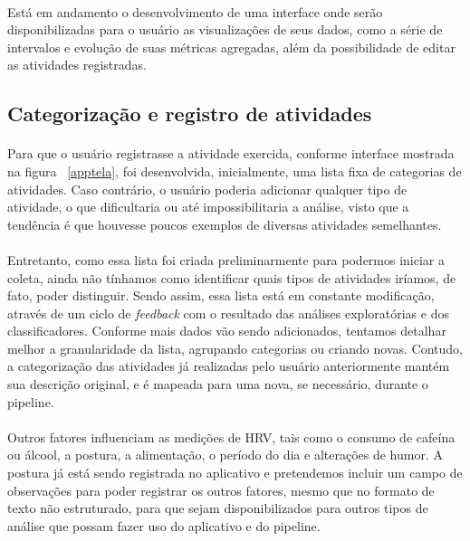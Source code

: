             \paragraph{} Está em andamento o desenvolvimento de uma interface onde serão disponibilizadas para o usuário as visualizações de seus dados, como a série de intervalos e evolução de suas métricas agregadas, além da possibilidade de editar as atividades registradas.
        
        \subsection{Categorização e registro de atividades} \label{categories}
    
            \paragraph{} Para que o usuário registrasse a atividade exercida, conforme interface mostrada na figura ~\ref{apptela}, foi desenvolvida, inicialmente, uma lista fixa de categorias de atividades. Caso contrário, o usuário poderia adicionar qualquer tipo de atividade, o que dificultaria ou até impossibilitaria a análise, visto que a tendência é que houvesse poucos exemplos de diversas atividades semelhantes. 
            
            \paragraph{} Entretanto, como essa lista foi criada preliminarmente para podermos iniciar a coleta, ainda não tínhamos como identificar quais tipos de atividades iríamos, de fato, poder distinguir. Sendo assim, essa lista está em constante modificação, através de um ciclo de \textit{feedback} com o resultado das análises exploratórias e dos classificadores. Conforme mais dados vão sendo adicionados, tentamos detalhar melhor a granularidade da lista, agrupando categorias ou criando novas. Contudo, a categorização das atividades já realizadas pelo usuário anteriormente mantém sua descrição original, e é mapeada para uma nova, se necessário, durante o pipeline.
            
            \paragraph{} Outros fatores influenciam as medições de HRV, tais como o consumo de cafeína ou álcool, a postura, a alimentação, o período do dia e alterações de humor. A postura já está sendo registrada no aplicativo e pretendemos incluir um campo de observações para poder registrar os outros fatores, mesmo que no formato de texto não estruturado, para que sejam disponibilizados para outros tipos de análise que possam fazer uso do aplicativo e do pipeline.
            


